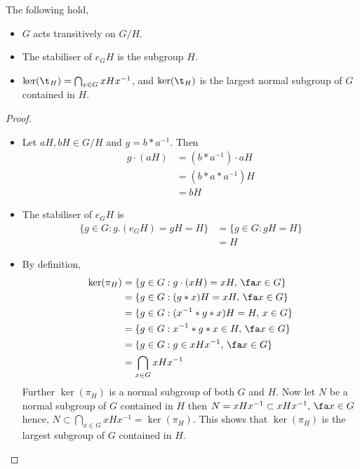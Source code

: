 \begin{nthm}
  The following hold,
  \begin{itemize}
    \item $G$ acts transitively on $G/H$.
    \item The stabiliser of $e_GH$ is the subgroup $H$.
    \item $\ker (\t_H) = \bigcap_{x \in G} xHx^{-1}$, and $\ker (\t_H)$ is the largest normal subgroup of $G$ contained in $H$.
  \end{itemize}
\end{nthm}
\begin{proof}
  \begin{itemize}
    \item Let $aH, bH \in G/H$ and $g = b * a^{-1}$. Then
    \begin{align*}
      g \cdot(aH) &= (b * a^{-1})\cdot aH\\
      &= (b * a * a^{-1})H \\
      &= bH
    \end{align*}
    \item The stabiliser of $e_GH$ is
    \begin{align*}
      \{g \in G : g.(e_GH) = gH = H\} &= \{g \in G : gH = H\}\\
      &= H
    \end{align*}
    \item By definition,
    \begin{align*}
      \ker (\pi_H) &= \{g \in G : g \cdot (xH) = xH,\, \fa x \in G\}\\
      &= \{g \in G : (g*x)H = xH,\, \fa x \in G\}\\
      &= \{g \in G : (x^{-1}*g*x)H = H,\,x\in G\}\\
      &= \{g \in G : x^{-1}*g*x \in H,\,\fa x \in G\}\\
      &= \{g \in G : g \in xHx^{-1},\, \fa x \in G\}\\
      &= \bigcap_{x \in G} xHx^{-1}
    \end{align*}
    Further $\ker (\pi_H)$ is a normal subgroup of both $G$ and $H$. Now let $N$ be a normal subgroup of $G$ contained in $H$ then $N = xHx^{-1} \subset xHx^{-1},\,\fa x \in G$ hence, $N \subset \bigcap_{x \in G} xHx^{-1} = \ker (\pi_H)$. This shows that $\ker (\pi_H)$ is the largest subgroup of $G$ contained in $H$.
  \end{itemize}
\end{proof}


